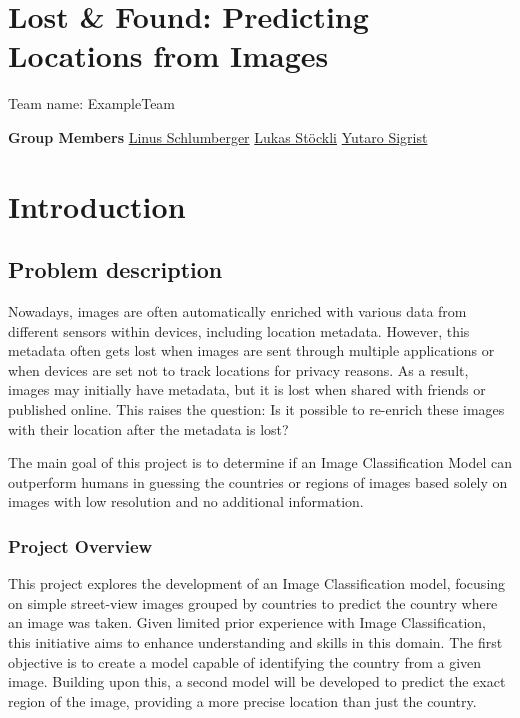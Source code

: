 \section{Lost \& Found: Predicting Locations from
Images}\label{lost-found-predicting-locations-from-images}

Team name: ExampleTeam

\textbf{Group Members} \href{https://gitlab.com/Killusions}{Linus
Schlumberger} \href{https://gitlab.com/Valairaa}{Lukas Stöckli}
\href{https://gitlab.com/yusigrist}{Yutaro Sigrist}

\begin{Shaded}
\begin{Highlighting}[]
\end{Highlighting}
\end{Shaded}

\section{Introduction}\label{introduction}

\subsection{Problem description}\label{problem-description}

Nowadays, images are often automatically enriched with various data from
different sensors within devices, including location metadata. However,
this metadata often gets lost when images are sent through multiple
applications or when devices are set not to track locations for privacy
reasons. As a result, images may initially have metadata, but it is lost
when shared with friends or published online. This raises the question:
Is it possible to re-enrich these images with their location after the
metadata is lost?

The main goal of this project is to determine if an Image Classification
Model can outperform humans in guessing the countries or regions of
images based solely on images with low resolution and no additional
information.

\subsubsection{Project Overview}\label{project-overview}

This project explores the development of an Image Classification model,
focusing on simple street-view images grouped by countries to predict
the country where an image was taken. Given limited prior experience
with Image Classification, this initiative aims to enhance understanding
and skills in this domain. The first objective is to create a model
capable of identifying the country from a given image. Building upon
this, a second model will be developed to predict the exact region of
the image, providing a more precise location than just the country.


